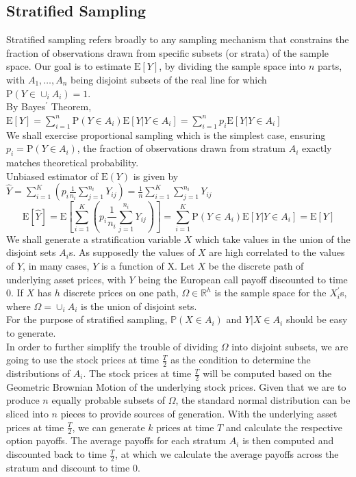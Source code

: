 \subsection{Stratified Sampling}
Stratified sampling refers broadly to any sampling mechanism that constrains the fraction of observations drawn from specific subsets (or strata) of the sample space. Our goal is to estimate $\mathrm{E}[Y]$, by dividing the sample space into $n$ parts, with $A_{1}, \dots ,A_{n}$ being disjoint subsets of the real line for which $\mathrm{P}(Y \in \cup_{i}A_{i}) = 1$. \\[1mm]
By Bayes$^{\prime}$ Theorem, $ \mathrm{E}[Y] = \sum_{i=1}^{n}\mathrm{P}(Y \in A_{i})\mathrm{E}[Y|Y \in A_{i}] = \sum_{i=1}^{n}p_{i}\mathrm{E}[Y|Y \in A_{i}] $\\
We shall exercise proportional sampling which is the simplest case, ensuring $p_{i} = \mathrm{P}(Y \in A_{i})$, the fraction of observations drawn from stratum $A_{i}$ exactly matches theoretical probability.\\[1mm]
Unbiased estimator of $\mathrm{E}(Y)$ is given by $\hat{Y} = \sum_{i=1}^{K} (p_{i} \frac{1}{n_{i}} \sum_{j=1}^{n_{i}} Y_{ij}) = \frac{1}{n} \sum_{i=1}^{K} \sum_{j=1}^{n_{i}} Y_{ij}$
$$ \mathrm{E}[\hat{Y}] = \mathrm{E}[\sum_{i=1}^{K} (p_{i} \frac{1}{n_{i}} \sum_{j=1}^{n_{i}} Y_{ij})] = \sum_{i=1}^{K}\mathrm{P}(Y \in A_{i})\mathrm{E}[Y|Y \in A_{i}] = \mathrm{E}[Y]$$
We shall generate a stratification variable $X$ which take values in the union of the disjoint sets $A_{i}$s. As supposedly the values of $X$ are high correlated to the values of $Y$, in many cases, $Y$ is a function of X. Let $X$ be the discrete path of underlying asset prices, with $Y$ being the European call payoff discounted to time 0. If $X$ has $h$ discrete prices on one path, $\Omega \in \mathbb{R}^{h}$ is the sample space for the $X_{i}^{\prime}$s, where $\Omega = \cup_{i} A_{i}$ is the union of disjoint sets.\\
For the purpose of stratified sampling, $\mathbb{P}(X \in A_{i})$ and $Y | X \in A_{i}$ should be easy to generate.\\
In order to further simplify the trouble of dividing $\Omega$ into disjoint subsets, we are going to use the stock prices at time $\frac{T}{2}$ as the condition to determine the distributions of $A_{i}$. The stock prices at time $\frac{T}{2}$ will be computed based on the Geometric Brownian Motion of the underlying stock prices. Given that we are to produce $n$ equally probable subsets of $\Omega$, the standard normal distribution can be sliced into $n$ pieces to provide sources of generation. With the underlying asset prices at time $\frac{T}{2}$, we can generate $k$ prices at time $T$ and calculate the respective option payoffs. The average payoffs for each stratum $A_{i}$ is then computed and discounted back to time $\frac{T}{2}$, at which we calculate the average payoffs across the stratum and discount to time $0$. \\[2mm]
